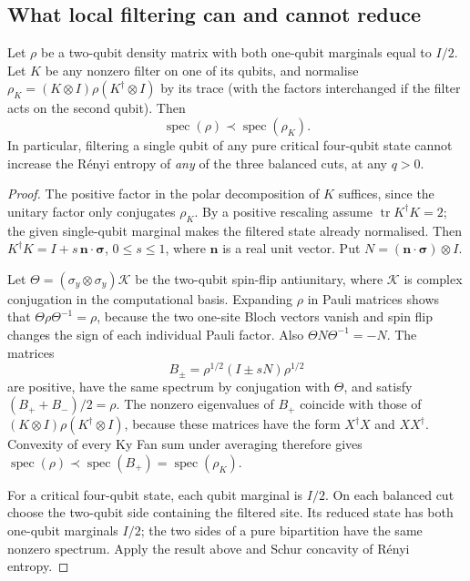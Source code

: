 

\subsection{What local filtering can and cannot reduce}
\label{sec:fqe-renyi-filter-limit}

\begin{lemma}
\label{lem:fqe-single-filter}
Let $\rho$ be a two-qubit density matrix with both one-qubit
marginals equal to $I/2$. Let $K$ be any nonzero filter on
one of its qubits, and normalise
$\rho_K=(K\otimes I)\rho(K^\dagger\otimes I)$ by its trace
(with the factors interchanged if the filter acts on the second qubit).
Then
\[
\operatorname{spec}(\rho)\prec\operatorname{spec}(\rho_K).
\tag{FM}\label{eq:fqe-filter-majorization}
\]
In particular, filtering a single qubit of any pure critical four-qubit
state cannot increase the R\'enyi entropy of \emph{any} of the three
balanced cuts, at any $q>0$.
\end{lemma}
\begin{proof}
The positive factor in the polar decomposition of $K$ suffices,
since the unitary factor only conjugates $\rho_K$. By a positive
rescaling assume $\operatorname{tr}K^\dagger K=2$; the given
single-qubit marginal makes the filtered state already normalised.
Then $K^\dagger K=I+s\,\mathbf n\cdot\boldsymbol\sigma$,
$0\le s\le1$, where $\mathbf n$ is a real unit vector. Put
$N=(\mathbf n\cdot\boldsymbol\sigma)\otimes I$.

Let $\Theta=(\sigma_y\otimes\sigma_y)\mathcal K$ be the
two-qubit spin-flip antiunitary, where $\mathcal K$ is
complex conjugation in the computational basis.
Expanding $\rho$ in Pauli matrices shows that
$\Theta\rho\Theta^{-1}=\rho$, because the two one-site
Bloch vectors vanish and spin flip changes the sign of
each individual Pauli factor. Also
$\Theta N\Theta^{-1}=-N$.
The matrices
\[
B_\pm=\rho^{1/2}(I\pm sN)\rho^{1/2}
\]
are positive, have the same spectrum by conjugation with
$\Theta$, and satisfy $(B_++B_-)/2=\rho$.
The nonzero eigenvalues of $B_+$ coincide with those of
$(K\otimes I)\rho(K^\dagger\otimes I)$, because these
matrices have the form $X^\dagger X$ and $XX^\dagger$.
Convexity of every Ky Fan sum under averaging therefore gives
$\operatorname{spec}(\rho)\prec\operatorname{spec}(B_+)
=\operatorname{spec}(\rho_K)$.

For a critical four-qubit state, each qubit marginal is $I/2$.
On each balanced cut choose the two-qubit side containing the
filtered site. Its reduced state has both one-qubit marginals $I/2$;
the two sides of a pure bipartition have the same nonzero spectrum.
Apply the result above and Schur concavity of R\'enyi entropy.
\end{proof}

